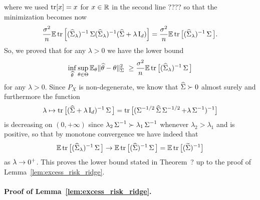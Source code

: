 where we used $\tr[x] = x$ for $x \in \R$ in the second line ???? so that the minimization becomes now
\begin{equation*}
	\frac{\sigma^2}{n} \E \tr \Big[ (\wh \bSigma_\lambda)^{-1} \bSigma (\wh \bSigma_\lambda)^{-1} (\wh \bSigma + \lambda \bI_d) \Big] = \frac{\sigma^2}{n} \E \tr \big[ (\wh \bSigma_\lambda)^{-1} \bSigma \big].
\end{equation*}
So, we proved that for any $\lambda > 0$ we have the lower bound
\begin{equation*}
	\inf_{\wh \theta} \sup_{\theta \in \Theta} \E_\theta \norm{\wh \theta - \theta}_{\bSigma}^2 \geq
	\frac{\sigma^2}{n} \E \tr \big[ (\wh \bSigma_\lambda)^{-1} \bSigma \big]
\end{equation*}
for any $\lambda > 0$.
Since $P_X$ is non-degenerate, we know that $\wh \Sigma \succ 0$ almost surely and furthermore the function 
\begin{equation*}
	\lambda \mapsto \tr \big[ (\wh \bSigma + \lambda \bI_d)^{-1} \bSigma \big] 
	= \tr \big[ (\bSigma^{-1/2} \wh \bSigma \bSigma^{-1/2} + \lambda \bSigma^{-1})^{-1} \big]
\end{equation*}
is decreasing on $(0, +\infty)$ since $\lambda_2 \bSigma^{-1} \succ \lambda_1 \bSigma^{-1}$ whenever $\lambda_2 > \lambda_1$ and is positive, so that by monotone convergence we have indeed that
\begin{equation*}
	\E \tr \big[ (\wh \bSigma_\lambda)^{-1} \bSigma \big] \go 
	\E \tr \big[ (\wh \bSigma)^{-1} \bSigma \big] = \E \tr \big[ (\wt \bSigma)^{-1} \big]
\end{equation*}
as $\lambda \go 0^+$.
This proves the lower bound stated in Theorem~? up to the proof of Lemma~\ref{lem:excess_risk_ridge}.

\paragraph{Proof of Lemma~\ref{lem:excess_risk_ridge}.}

